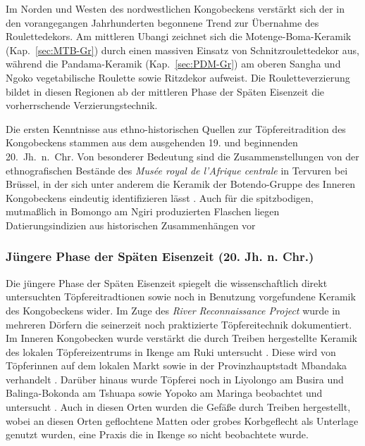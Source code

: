 Im Norden und Westen des nordwestlichen Kongobeckens verstärkt sich der in den vorangegangen Jahrhunderten begonnene Trend zur Übernahme des Roulettedekors. Am mittleren Ubangi zeichnet sich die Motenge-Boma-Keramik (Kap.~\ref{sec:MTB-Gr}) durch einen massiven Einsatz von Schnitzroulettedekor aus, während die Pandama-Keramik (Kap.~\ref{sec:PDM-Gr}) am oberen Sangha und Ngoko vegetabilische Roulette sowie Ritzdekor aufweist. Die Rouletteverzierung bildet in diesen Regionen ab der mittleren Phase der Späten Eisenzeit die vorherrschende Verzierungstechnik.

Die ersten Kenntnisse aus ethno-historischen Quellen zur Töpfereitradition des Kongobeckens stammen aus dem ausgehenden 19. und beginnenden 20.~Jh.~n.~Chr. Von besonderer Bedeutung sind die Zusammenstellungen von \textcite{Coart.1907} der ethnografischen Bestände des \textit{Musée royal de l'Afrique centrale} in Tervuren bei Brüssel, in der sich unter anderem die Keramik der Botendo-Gruppe des Inneren Kongobeckens eindeutig identifizieren lässt \parencite[25 Anm.~12, 157]{Wotzka.1995}. Auch für die spitzbodigen, mutmaßlich in Bomongo am Ngiri produzierten Flaschen liegen Datierungsindizien aus historischen Zusammenhängen vor \parencite[167 Abb. III.11.1; Kap.~\ref{sec:SHG-LKW_Einzelfunde}]{OmasomboTshonda.2014}

\subsubsection*{Jüngere Phase der Späten Eisenzeit (20. Jh. n. Chr.)}

Die jüngere Phase der Späten Eisenzeit spiegelt die wissenschaftlich direkt untersuchten Töpfereitradtionen sowie noch in Benutzung vorgefundene Keramik des Kongobeckens wider. Im Zuge des \textit{River Reconnaissance Project} wurde in mehreren Dörfern die seinerzeit noch praktizierte Töpfereitechnik dokumentiert. Im Inneren Kongobecken wurde verstärkt die durch Treiben hergestellte Keramik des lokalen Töpfereizentrums in Ikenge am Ruki untersucht \parencites{Eggert.1980c}{Wotzka.1991}. Diese wird von Töpferinnen auf dem lokalen Markt sowie in der Provinzhauptstadt Mbandaka verhandelt \parencites[395f.;]{Eggert.1980c}{Eggert.1991}. Darüber hinaus wurde Töpferei noch in Liyolongo am Busira und Balinga-Bokonda am Tshuapa sowie Yopoko am Maringa beobachtet und untersucht \parencite[188, 196f.; Kap.~\ref{sec:ToepfereiEthnogr}]{Wotzka.1991}. Auch in diesen Orten wurden die Gefäße durch Treiben hergestellt, wobei an diesen Orten geflochtene Matten oder grobes Korbgeflecht als Unterlage genutzt wurden, eine Praxis die in Ikenge so nicht beobachtete wurde.

